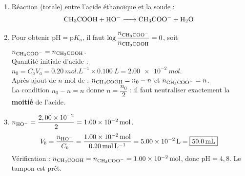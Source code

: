 \documentclass[11pt]{article}
\begin{document}
\begin{corrige}
\begin{enumerate}
  \item Réaction (totale) entre l'acide éthanoïque et la soude :
  \[ \ce{CH3COOH + HO- -> CH3COO- + H2O} \]
  \item Pour obtenir $\mathrm{pH} = \mathrm{p}K_a$, il faut $\log\dfrac{n_{\ce{CH3COO-}}}{n_{\ce{CH3COOH}}} = 0$, soit $n_{\ce{CH3COO-}} = n_{\ce{CH3COOH}}$. \\
  Quantité initiale d'acide : $n_0 = C_a V_a = \SI{0,20}{mol.L^{-1}} \times \SI{0,100}{L} = \SI{2,00e-2}{mol}$. \\
  Après ajout de $n$ mol de  : $n_{\ce{CH3COOH}} = n_0 - n$ et $n_{\ce{CH3COO-}} = n$. \\
  La condition $n_0 - n = n$ donne $n = \dfrac{n_0}{2}$ : il faut neutraliser exactement la \textbf{moitié} de l'acide.
  \item $n_{\ce{HO-}} = \dfrac{2,00\times10^{-2}}{2} = \SI{1,00e-2}{mol}$.
  \[
  V_b = \frac{n_{\ce{HO-}}}{C_b} = \frac{\SI{1,00e-2}{mol}}{\SI{0,20}{mol.L^{-1}}} = \SI{5,00e-2}{L} = \boxed{\SI{50,0}{mL}}
  \]
  Vérification : $n_{\ce{CH3COOH}} = n_{\ce{CH3COO-}} = \SI{1,00e-2}{mol}$, donc $\mathrm{pH} = 4,8$. Le tampon est prêt.
\end{enumerate}
\end{corrige}
\end{document}
